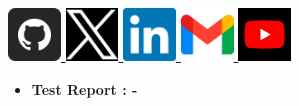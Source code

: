 \documentclass[10pt]{article}
\begin{document}
\begin{titlepage}
\begin{center}
  \href{https://github.com/ADITYADAS1999}{
    \includegraphics[width=1.4cm]{3291667.png}
  } \hspace{0.5cm}
  \href{https://twitter.com/ADITYA90546170}{
    \includegraphics[width=1.4cm]{images.png}
  } \hspace{0.5cm}
  \href{https://www.linkedin.com/in/aditya-das-7b2276202}{
    \includegraphics[width=1.4cm]{linkin.png}
  } \hspace{0.5cm}
  \href{mailto:adityamca123@gmail.com}{
    \includegraphics[width=1.4cm]{mail.png}
  }\hspace{0.5cm}
  \href{mailto:your.email@example.com}{
    \includegraphics[width=1.4cm]{yiutube.jpg}
  }
\end{center}













\thispagestyle{empty}
\end{titlepage}

\restoregeometry
\pagecolor{white}
\color{black}

\clearpage
\pagestyle{empty} %
\renewcommand{\contentsname}{{\Huge Contents}}





\newpage

\begin{itemize}
    \item \LARGE \textbf{{Test Report : -}}
\end{itemize}
\end{document}
